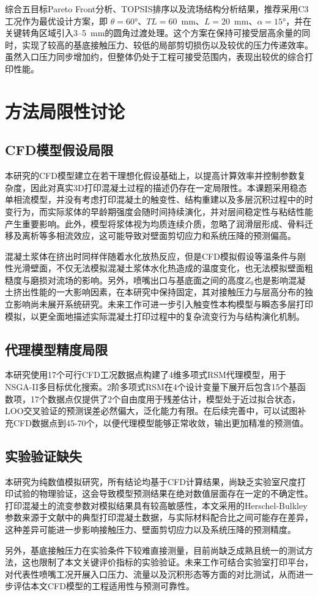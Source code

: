 综合五目标Pareto Front分析、TOPSIS排序以及流场结构分析结果，推荐采用C3工况作为最优设计方案，即 $\theta=60°$、$TL=60$~mm、$L=20$~mm、$\alpha=15°$，并在关键转角区域引入3--5~mm的圆角过渡处理。这个方案在保持可接受层高余量的同时，实现了较高的基底接触压力、较低的局部剪切损伤以及较优的压力传递效率。虽然入口压力同步增加约，但整体仍处于工程可接受范围内，表现出较优的综合打印性能。

\section{方法局限性讨论}

\subsection{CFD模型假设局限}

本研究的CFD模型建立在若干理想化假设基础上，以提高计算效率并控制参数复杂度，因此对真实3D打印混凝土过程的描述仍存在一定局限性。本课题采用稳态单相流模型，并没有考虑打印混凝土的触变性、结构重建以及多层沉积过程中的时变行为，而实际浆体的早龄期强度会随时间持续演化，并对层间稳定性与粘结性能产生重要影响。此外，模型将浆体视为均质连续介质，忽略了润滑层形成、骨料迁移及离析等多相流效应，这可能导致对壁面剪切应力和系统压降的预测偏高。

混凝土浆体在挤出时同样伴随着水化放热反应，但是CFD模拟假设等温条件与刚性光滑壁面，不仅无法模拟混凝土浆体水化热造成的温度变化，也无法模拟壁面粗糙度与磨损对流场的影响。另外，喷嘴出口与基底面之间的高度$Z_0$也是影响混凝土挤出性能的一大影响因素，在本研究中保持固定，其对接触压力与层高分布的独立影响尚未展开系统研究。未来工作可进一步引入触变性本构模型与瞬态多层打印模拟，以更全面地描述实际混凝土打印过程中的复杂流变行为与结构演化机制。

\subsection{代理模型精度局限}

本研究使用17个可行CFD工况数据点构建了4维多项式RSM代理模型，用于NSGA-II多目标优化搜索。2阶多项式RSM在4个设计变量下展开后包含15个基函数项，17个数据点仅提供了2个自由度用于残差估计，模型处于近过拟合状态，LOO交叉验证的预测误差必然偏大，泛化能力有限。在后续完善中，可以试图补充CFD数据点到45-70个，以便代理模型能够正常收敛，输出更加精准的预测值。

\subsection{实验验证缺失}

本研究为纯数值模拟研究，所有结论均基于CFD计算结果，尚缺乏实验室尺度打印试验的物理验证，这会导致模型预测结果在绝对数值层面存在一定的不确定性。打印混凝土的流变参数对模拟结果具有较高敏感性，本文采用的Herschel-Bulkley参数来源于文献中的典型打印混凝土数据，与实际材料配合比之间可能存在差异，这种差异可能进一步影响接触压力、壁面剪切应力以及系统压降的预测精度。

另外，基底接触压力在实验条件下较难直接测量，目前尚缺乏成熟且统一的测试方法，这也限制了本文关键评价指标的实验验证。未来工作可结合实验室打印平台，对代表性喷嘴工况开展入口压力、流量以及沉积形态等方面的对比测试，从而进一步评估本文CFD模型的工程适用性与预测可靠性。
